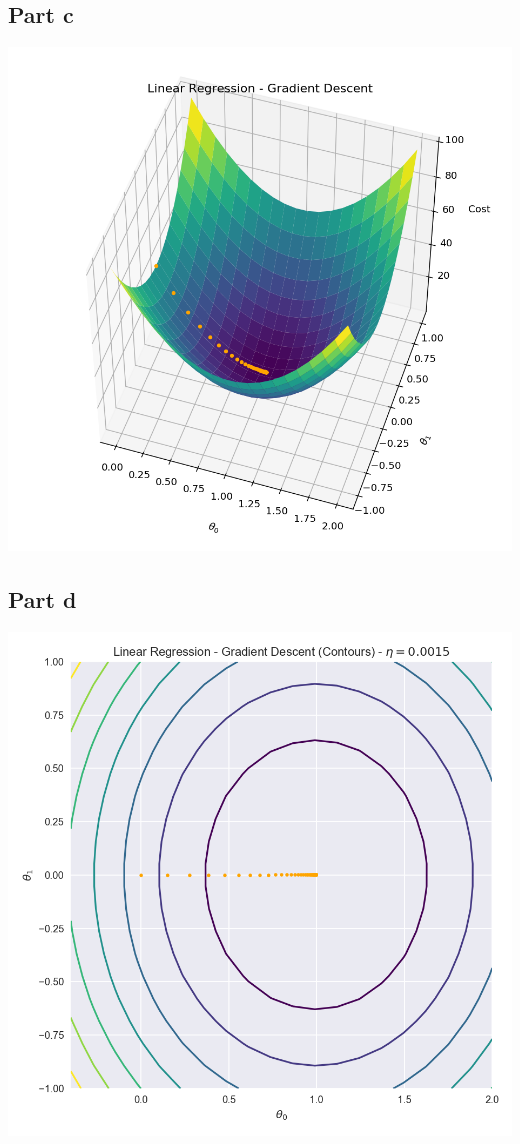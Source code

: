 \documentclass[12pt]{article}
\begin{document}
\subsection*{Part c}
\begin{center}
\includegraphics[scale=0.35]{linear2.png}
\end{center}
\subsection*{Part d}
\begin{center}
\includegraphics[scale=0.35]{linear3.png}
\end{center}
\end{document}
